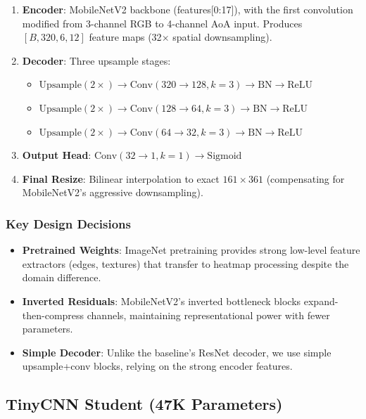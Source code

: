 \documentclass[11pt,a4paper]{article}
\begin{document}
\begin{enumerate}[leftmargin=*]
    \item \textbf{Encoder}: MobileNetV2 backbone (features[0:17]), with the first convolution modified from 3-channel RGB to 4-channel AoA input. Produces $[B, 320, 6, 12]$ feature maps (32$\times$ spatial downsampling).
    \item \textbf{Decoder}: Three upsample stages:
    \begin{itemize}
        \item $\text{Upsample}(2\times) \to \text{Conv}(320 \to 128, k{=}3) \to \text{BN} \to \text{ReLU}$
        \item $\text{Upsample}(2\times) \to \text{Conv}(128 \to 64, k{=}3) \to \text{BN} \to \text{ReLU}$
        \item $\text{Upsample}(2\times) \to \text{Conv}(64 \to 32, k{=}3) \to \text{BN} \to \text{ReLU}$
    \end{itemize}
    \item \textbf{Output Head}: $\text{Conv}(32 \to 1, k{=}1) \to \text{Sigmoid}$
    \item \textbf{Final Resize}: Bilinear interpolation to exact $161\times361$ (compensating for MobileNetV2's aggressive downsampling).
\end{enumerate}

\subsubsection{Key Design Decisions}
\begin{itemize}[leftmargin=*]
    \item \textbf{Pretrained Weights}: ImageNet pretraining provides strong low-level feature extractors (edges, textures) that transfer to heatmap processing despite the domain difference.
    \item \textbf{Inverted Residuals}: MobileNetV2's inverted bottleneck blocks expand-then-compress channels, maintaining representational power with fewer parameters.
    \item \textbf{Simple Decoder}: Unlike the baseline's ResNet decoder, we use simple upsample+conv blocks, relying on the strong encoder features.
\end{itemize}

\subsection{TinyCNN Student (47K Parameters)}
\end{document}
